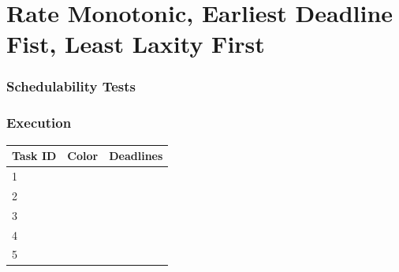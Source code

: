 \documentclass[xcolor=table]{beamer}
\begin{document}

\section{Rate Monotonic, Earliest Deadline Fist, Least Laxity First}

\begin{frame}
\frametitle{Schedulability Tests}

\end{frame}

\begin{frame}
\frametitle{Execution}

\begin{table}[]
\begin{tabular}{|l|l|l|}
\hline
Task ID & Color                    & Deadlines \\ \hline
1       & \cellcolor[HTML]{FFCC67} &  \\ \hline
2       & \cellcolor[HTML]{FFC702} & \\ \hline
3       & \cellcolor[HTML]{6200C9} & \\ \hline
4       & \cellcolor[HTML]{303498} & \\ \hline
5       & \cellcolor[HTML]{FD6864} & \\ \hline
\end{tabular}
\end{table}

\begin{table}[]
\end{table}

\end{frame}
\end{document}
